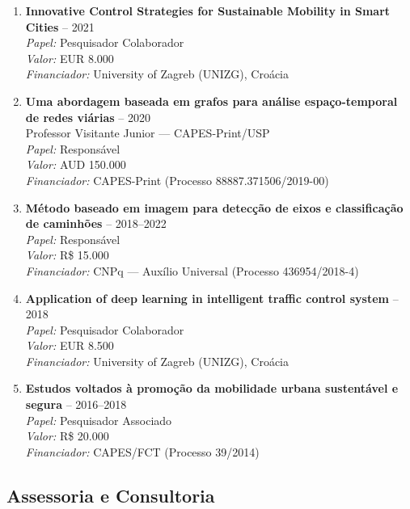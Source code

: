 \documentclass[
  brazilian,
  11pt,
  a4paper,
]{article}
\begin{document}
\begin{enumerate}
  \emph{Papel:} Responsável\\
  \emph{Valor:} R\$ 40.000\\
  \emph{Financiador:} CNPq --- Bolsa de Produtividade em Pesquisa
  (Processo 311964/2022-2)
\item
  \textbf{Innovative Control Strategies for Sustainable Mobility in
  Smart Cities} -- 2021\\
  \emph{Papel:} Pesquisador Colaborador\\
  \emph{Valor:} EUR 8.000\\
  \emph{Financiador:} University of Zagreb (UNIZG), Croácia
\item
  \textbf{Uma abordagem baseada em grafos para análise espaço-temporal
  de redes viárias} -- 2020\\
  Professor Visitante Junior --- CAPES-Print/USP\\
  \emph{Papel:} Responsável\\
  \emph{Valor:} AUD 150.000\\
  \emph{Financiador:} CAPES-Print (Processo 88887.371506/2019-00)
\item
  \textbf{Método baseado em imagem para detecção de eixos e
  classificação de caminhões} -- 2018--2022\\
  \emph{Papel:} Responsável\\
  \emph{Valor:} R\$ 15.000\\
  \emph{Financiador:} CNPq --- Auxílio Universal (Processo
  436954/2018-4)
\item
  \textbf{Application of deep learning in intelligent traffic control
  system} -- 2018\\
  \emph{Papel:} Pesquisador Colaborador\\
  \emph{Valor:} EUR 8.500\\
  \emph{Financiador:} University of Zagreb (UNIZG), Croácia
\item
  \textbf{Estudos voltados à promoção da mobilidade urbana sustentável e
  segura} -- 2016--2018\\
  \emph{Papel:} Pesquisador Associado\\
  \emph{Valor:} R\$ 20.000\\
  \emph{Financiador:} CAPES/FCT (Processo 39/2014)
\end{enumerate}

\subsection{Assessoria e Consultoria}\label{assessoria-e-consultoria}
\end{document}
